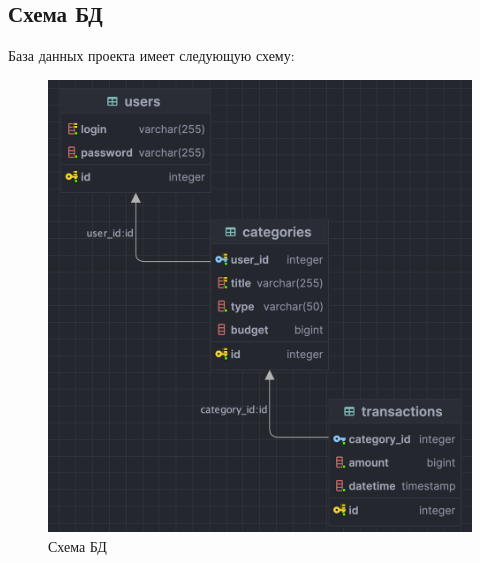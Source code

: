 \documentclass[a4paper, 14pt]{article}
\begin{document}
\subsection{Схема БД}

База данных проекта имеет следующую схему:

\begin{figure}[H]
	\centering
	\includegraphics[width=17cm]{resources/1.png}
	\caption{Схема БД}
\end{figure}
\end{document}
